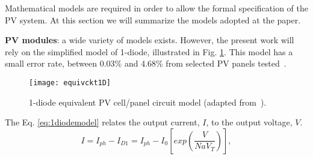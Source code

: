 %
%
% 
Mathematical models are required in order to allow the formal specification of the PV system. At this section we will summarize the models adopted at the paper.

\textbf{PV modules}: a wide variety of models exists. %
However, the present work will rely on the simplified model of 1-diode, illustrated in Fig. \ref{fig:equivckt}. This model has a small error rate, between 0.03\% and 4.68\% from selected PV panels tested~\cite{Saloux}.

\begin{figure}[h]
\texttt{[image: equivckt1D]}
\centering
\caption{1-diode equivalent PV cell/panel circuit model (adapted from~\cite{Cubas}).}
\label{fig:equivckt}
\end{figure}

The Eq. \eqref{eq:1diodemodel} relates the output current, $I$, to the output voltage, $V$. %
\begin{equation}
\label{eq:1diodemodel}
I = I_{ph}-I_{D1}=I_{ph}-I_{0}\left[ exp \left( \dfrac{V}{NaV_{T}} \right)  \right], 
\end{equation}

